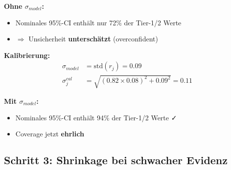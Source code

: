 \begin{tcolorbox}[colback=yellow!5!white, colframe=yellow!75!black,
    title=\textbf{Beispiel: Coverage-Kalibrierung}]

\textbf{Ohne $\sigma_{model}$:}
\begin{itemize}[nosep]
    \item Nominales 95\%-CI enthält nur 72\% der Tier-1/2 Werte
    \item $\Rightarrow$ Unsicherheit \textbf{unterschätzt} (overconfident)
\end{itemize}

\textbf{Kalibrierung:}
\begin{align*}
\sigma_{model} &= \text{std}(r_j) = 0.09 \\
\sigma_j^{cal} &= \sqrt{(0.82 \times 0.08)^2 + 0.09^2} = 0.11
\end{align*}

\textbf{Mit $\sigma_{model}$:}
\begin{itemize}[nosep]
    \item Nominales 95\%-CI enthält 94\% der Tier-1/2 Werte ✓
    \item Coverage jetzt \textbf{ehrlich}
\end{itemize}

\end{tcolorbox}

\subsection{Schritt 3: Shrinkage bei schwacher Evidenz}

